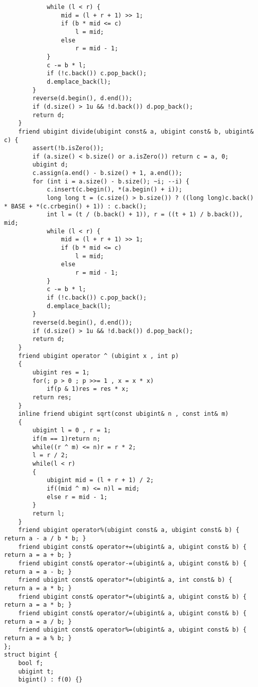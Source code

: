 \begin{verbatim}
            while (l < r) {
                mid = (l + r + 1) >> 1;
                if (b * mid <= c)
                    l = mid;
                else
                    r = mid - 1;
            }
            c -= b * l;
            if (!c.back()) c.pop_back();
            d.emplace_back(l);
        }
        reverse(d.begin(), d.end());
        if (d.size() > 1u && !d.back()) d.pop_back();
        return d;
    }
    friend ubigint divide(ubigint const& a, ubigint const& b, ubigint& c) {
        assert(!b.isZero());
        if (a.size() < b.size() or a.isZero()) return c = a, 0;
        ubigint d;
        c.assign(a.end() - b.size() + 1, a.end());
        for (int i = a.size() - b.size(); ~i; --i) {
            c.insert(c.begin(), *(a.begin() + i));
            long long t = (c.size() > b.size()) ? ((long long)c.back() * BASE + *(c.crbegin() + 1)) : c.back();
            int l = (t / (b.back() + 1)), r = ((t + 1) / b.back()), mid;
            while (l < r) {
                mid = (l + r + 1) >> 1;
                if (b * mid <= c)
                    l = mid;
                else
                    r = mid - 1;
            }
            c -= b * l;
            if (!c.back()) c.pop_back();
            d.emplace_back(l);
        }
        reverse(d.begin(), d.end());
        if (d.size() > 1u && !d.back()) d.pop_back();
        return d;
    }
    friend ubigint operator ^ (ubigint x , int p)
    {
        ubigint res = 1;
        for(; p > 0 ; p >>= 1 , x = x * x)
            if(p & 1)res = res * x;
        return res;
    }   
    inline friend ubigint sqrt(const ubigint& n , const int& m)
    {
        ubigint l = 0 , r = 1;
        if(m == 1)return n;
        while((r ^ m) <= n)r = r * 2;
        l = r / 2;
        while(l < r)
        {
            ubigint mid = (l + r + 1) / 2;
            if((mid ^ m) <= n)l = mid;
            else r = mid - 1;
        }
        return l;
    }
    friend ubigint operator%(ubigint const& a, ubigint const& b) { return a - a / b * b; }
    friend ubigint const& operator+=(ubigint& a, ubigint const& b) { return a = a + b; }
    friend ubigint const& operator-=(ubigint& a, ubigint const& b) { return a = a - b; }
    friend ubigint const& operator*=(ubigint& a, int const& b) { return a = a * b; }
    friend ubigint const& operator*=(ubigint& a, ubigint const& b) { return a = a * b; }
    friend ubigint const& operator/=(ubigint& a, ubigint const& b) { return a = a / b; }
    friend ubigint const& operator%=(ubigint& a, ubigint const& b) { return a = a % b; }
};
struct bigint {
    bool f;
    ubigint t;
    bigint() : f(0) {}

\end{verbatim}
